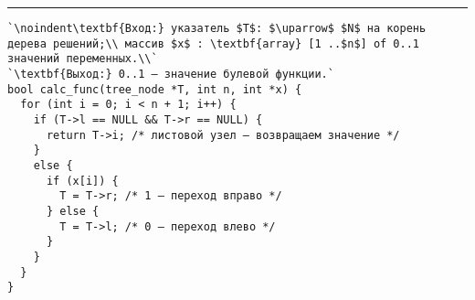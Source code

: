 \vspace{5pt} \hrule

\begin{lstlisting}[caption={Вычисление сокращённого дерева решений}, label=p138_calc_function, escapechar=`]
`\noindent\textbf{Вход:} указатель $T$: $\uparrow$ $N$ на корень дерева решений;\\ массив $x$ : \textbf{array} [1 ..$n$] of 0..1 значений переменных.\\`
`\textbf{Выход:} 0..1 — значение булевой функции.`
bool calc_func(tree_node *T, int n, int *x) {
  for (int i = 0; i < n + 1; i++) {
    if (T->l == NULL && T->r == NULL) {
      return T->i; /* листовой узел — возвращаем значениe */
    }
    else {
      if (x[i]) {
        T = T->r; /* 1 — переход вправо */
      } else {
        T = T->l; /* 0 — переход влево */
      }
    }
  }
}
\end{lstlisting}
